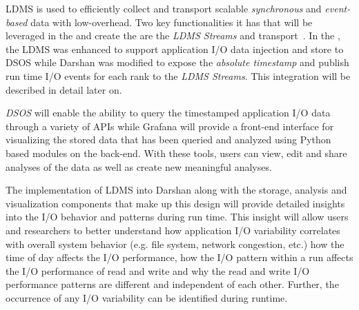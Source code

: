LDMS is used to efficiently collect and transport scalable \emph{synchronous} and \emph{event-based} data with low-overhead. Two key functionalities it has that will be leveraged in the \Darshan and create the \connector are the \emph{LDMS Streams} and transport~\cite{ldmsgithub}. In the \Darshan, the LDMS was enhanced to support application I/O data injection and store to DSOS while Darshan was modified to expose the \emph{absolute timestamp} and publish run time I/O events for each rank to the \emph{LDMS Streams}. This integration will be described in detail later on.   


\emph{DSOS} will enable the ability to query the timestamped application I/O data through a variety of APIs while Grafana will provide a front-end interface for visualizing the stored data that has been queried and analyzed using Python based modules on the back-end. With these tools, users can view, edit and share analyses of the data as well as create new meaningful analyses. 

The implementation of LDMS into Darshan along with the storage, analysis and visualization components that make up this design will provide detailed insights into the I/O behavior and patterns during run time. This insight will allow users and researchers to better understand how application I/O variability correlates with overall system behavior (e.g. file system, network congestion, etc.) how the time of day affects the I/O performance, how the I/O pattern within a run affects the I/O performance of read and write and why the read and write I/O performance patterns are different and independent of each other. Further, the occurrence of any I/O variability can be identified during runtime.

